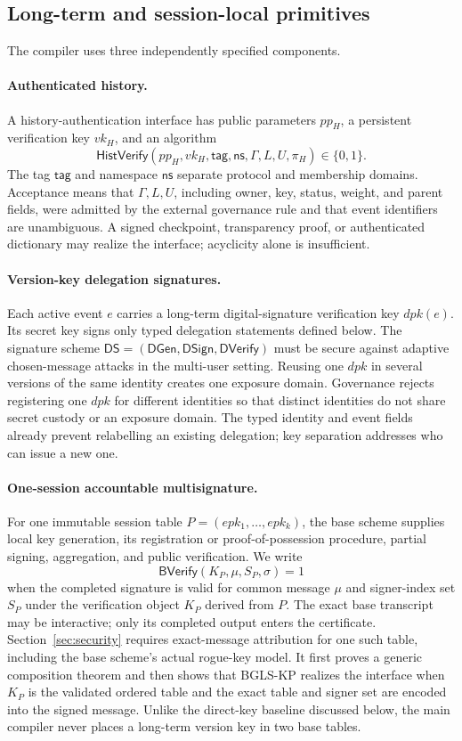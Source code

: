 \documentclass[11pt]{article}
\theoremstyle{definition}
\begin{document}
\subsection{Long-term and session-local primitives}
The compiler uses three independently specified components.

\paragraph{Authenticated history.}
A history-authentication interface has public parameters $pp_H$, a persistent verification key $vk_H$, and an algorithm
\[
  \mathsf{HistVerify}(pp_H,vk_H,\mathsf{tag},\mathsf{ns},\Gamma,L,U,\pi_H)\in\{0,1\}.
\]
The tag $\mathsf{tag}$ and namespace $\mathsf{ns}$ separate protocol and membership domains.  Acceptance means that $\Gamma,L,U$, including owner, key, status, weight, and parent fields, were admitted by the external governance rule and that event identifiers are unambiguous.  A signed checkpoint, transparency proof, or authenticated dictionary may realize the interface; acyclicity alone is insufficient.

\paragraph{Version-key delegation signatures.}
Each active event $e$ carries a long-term digital-signature verification key $dpk(e)$.  Its secret key signs only typed delegation statements defined below.  The signature scheme $\mathsf{DS}=(\mathsf{DGen},\mathsf{DSign},\mathsf{DVerify})$ must be secure against adaptive chosen-message attacks in the multi-user setting.  Reusing one $dpk$ in several versions of the same identity creates one exposure domain.  Governance rejects registering one $dpk$ for different identities so that distinct identities do not share secret custody or an exposure domain.  The typed identity and event fields already prevent relabelling an existing delegation; key separation addresses who can issue a new one.

\paragraph{One-session accountable multisignature.}
For one immutable session table $P=(epk_1,\ldots,epk_k)$, the base scheme supplies local key generation, its registration or proof-of-possession procedure, partial signing, aggregation, and public verification.  We write
\[
  \mathsf{BVerify}(K_P,\mu,S_P,\sigma)=1
\]
when the completed signature is valid for common message $\mu$ and signer-index set $S_P$ under the verification object $K_P$ derived from $P$.  The exact base transcript may be interactive; only its completed output enters the certificate.  Section~\ref{sec:security} requires exact-message attribution for one such table, including the base scheme's actual rogue-key model.  It first proves a generic composition theorem and then shows that BGLS-KP realizes the interface when $K_P$ is the validated ordered table and the exact table and signer set are encoded into the signed message.  Unlike the direct-key baseline discussed below, the main compiler never places a long-term version key in two base tables.
\end{document}
